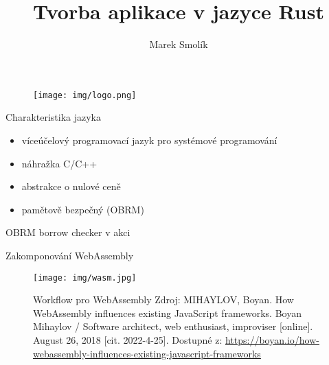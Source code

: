 \documentclass{beamer}
\author{Marek Smolík}
\title{Tvorba aplikace v jazyce Rust}
\institute{{Střední škola spojů a informatiky, Tábor, Bydlinského 2474}}
\date{}
\begin{document}
\begin{frame}
    \titlepage
    \begin{figure}[htpb]
        \begin{center}
            \texttt{[image: img/logo.png]}
        \end{center}
    \end{figure}
\end{frame}

\begin{frame}
    Charakteristika jazyka
    \begin{itemize}
        \item víceúčelový programovací jazyk pro systémové programování
        \item náhražka C/C++
        \item abstrakce o nulové ceně
        \item pamětově bezpečný (OBRM)
    \end{itemize}
\end{frame}



\begin{frame}{OBRM borrow checker v akci}
\lstI \pause \lstII
\end{frame}

\begin{frame}{Zakomponování WebAssembly}
\begin{figure}
    \centering
    \texttt{[image: img/wasm.jpg]}
    \caption{\footnotesize Workflow pro WebAssembly \newline Zdroj: {M}{I}{H}{A}{Y}{L}{O}{V}, {B}oyan. {H}ow {W}eb{A}ssembly influences existing {J}ava{S}cript frameworks. {B}oyan {M}ihaylov / {S}oftware architect, web enthusiast, improviser [online]. {A}ugust 26, 2018 [cit. 2022-4-25]. {D}ostupné z: {\tiny \url{https://boyan.io/how-webassembly-influences-existing-javascript-frameworks}}}
    \label{fig:my_label}
\end{figure}
\end{frame}
\end{document}
